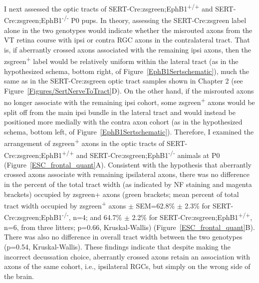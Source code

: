 I next assessed the optic tracts of SERT-Cre:zsgreen;EphB1\textsuperscript{+/+} and SERT-Cre:zsgreen;EphB1\textsuperscript{-/-} P0 pups.
In theory, assessing the SERT-Cre:zsgreen label alone in the two genotypes would indicate whether the misrouted axons from the VT retina course with ipsi or contra RGC axons in the contralateral tract.
That is, if aberrantly crossed axons associated with the remaining ipsi axons, then the zsgreen\textsuperscript{+} label would be relatively uniform within the lateral tract (as in the hypothesized schema, bottom right, of Figure~\ref{EphB1Sertschematic}), much the same as in the SERT-Cre:zsgreen optic tract samples shown in Chapter 2 (see Figure~\ref{Figures/SertNerveToTract}D).
On the other hand, if the misrouted axons no longer associate with the remaining ipsi cohort, some zsgreen\textsuperscript{+} axons would be split off from the main ipsi bundle in the lateral tract and would instead be positioned more medially with the contra axon cohort (as in the hypothesized schema, bottom left, of Figure~\ref{EphB1Sertschematic}).
Therefore, I examined the arrangement of zsgreen\textsuperscript{+} axons in the optic tracts of SERT-Cre:zsgreen;EphB1\textsuperscript{+/+} and SERT-Cre:zsgreen;EphB1\textsuperscript{-/-} animals at P0 (Figure~\ref{ESC_frontal_quant}A). 
Consistent with the hypothesis that aberrantly crossed axons associate with remaining ipsilateral axons, there was no difference in the percent of the total tract width (as indicated by NF staining and magenta brackets) occupied by zsgreen+ axons (green brackets; mean percent of total tract width occupied by zsgreen\textsuperscript{+} axons $\pm$ SEM=62.8\% $\pm$ 2.3\% for SERT-Cre:zsgreen;EphB1\textsuperscript{-/-}, n=4; and 64.7\% $\pm$ 2.2\% for SERT-Cre:zsgreen;EphB1\textsuperscript{+/+}, n=6, from three litters; p=0.66, Kruskal-Wallis) (Figure~\ref{ESC_frontal_quant}B).
There was also no difference in overall tract width between the two genotypes (p=0.54, Kruskal-Wallis).
These findings indicate that despite making the incorrect decussation choice, aberrantly crossed axons retain an association with axons of the same cohort, i.e., ipsilateral RGCs, but simply on the wrong side of the brain. 
